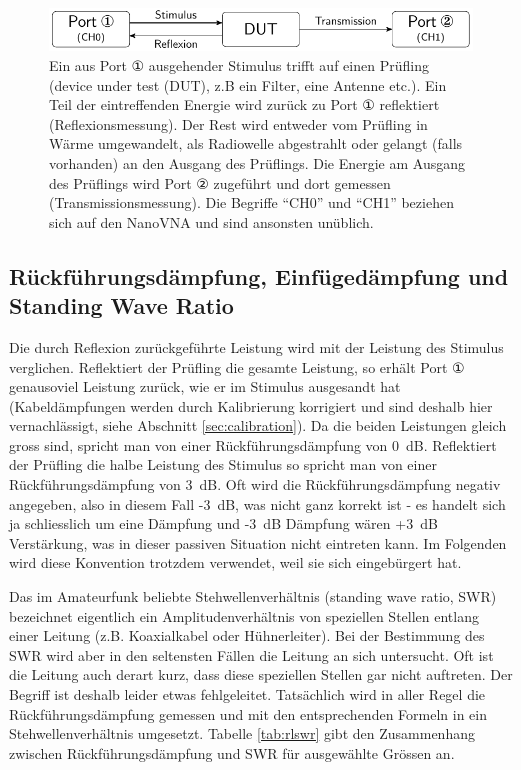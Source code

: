 \documentclass[twoside,a4paper,11pt,halfparskip,DIV=11,notitlepage]{scrartcl}
\begin{document}
\begin{figure}[H]
    \begin{center}
        \includegraphics{figures/vna_dut_setup/vna_dut_setup.pdf}
    \end{center}
    \caption{Ein aus Port ① ausgehender Stimulus trifft auf einen Prüfling (device under test (DUT), z.B
        ein Filter, eine Antenne etc.). Ein Teil der eintreffenden Energie wird zurück zu Port ① reflektiert
        (Reflexionsmessung). Der Rest wird entweder vom Prüfling in Wärme umgewandelt, als Radiowelle
        abgestrahlt oder gelangt (falls vorhanden) an den Ausgang des Prüflings. Die Energie am Ausgang
        des Prüflings wird Port ② zugeführt und dort gemessen (Transmissionsmessung). Die Begriffe ``CH0''
        und ``CH1'' beziehen sich auf den NanoVNA und sind ansonsten unüblich.}
    \label{fig:testset}
\end{figure}

\subsection{Rückführungsdämpfung, Einfügedämpfung und Standing Wave Ratio}

Die durch Reflexion zurückgeführte Leistung wird mit der Leistung des Stimulus verglichen. Reflektiert
der Prüfling die gesamte Leistung, so erhält Port ① genausoviel Leistung zurück, wie er im Stimulus
ausgesandt hat (Kabeldämpfungen werden durch Kalibrierung korrigiert und sind deshalb hier vernachlässigt,
siehe Abschnitt \ref{sec:calibration}). Da die beiden Leistungen gleich gross sind, spricht man von
einer Rückführungsdämpfung von 0~dB. Reflektiert der Prüfling die halbe Leistung des Stimulus so spricht
man von einer Rückführungsdämpfung von 3~dB. Oft wird die Rückführungsdämpfung negativ angegeben, also
in diesem Fall -3~dB, was nicht ganz korrekt ist - es handelt sich ja schliesslich um eine Dämpfung 
und -3~dB Dämpfung wären +3~dB Verstärkung, was in dieser passiven Situation nicht eintreten kann.
Im Folgenden wird diese Konvention trotzdem verwendet, weil sie sich eingebürgert hat.

Das im Amateurfunk beliebte Stehwellenverhältnis (standing wave ratio, SWR) bezeichnet eigentlich
ein Amplitudenverhältnis von speziellen Stellen entlang einer Leitung (z.B. Koaxialkabel oder
Hühnerleiter). Bei der Bestimmung des SWR wird aber in den seltensten Fällen die Leitung an sich
untersucht. Oft ist die Leitung auch derart kurz, dass diese speziellen Stellen gar nicht auftreten.
Der Begriff ist deshalb leider etwas fehlgeleitet. Tatsächlich wird in aller Regel die Rückführungsdämpfung
gemessen und mit den entsprechenden Formeln in ein Stehwellenverhältnis umgesetzt. Tabelle \ref{tab:rlswr}
gibt den Zusammenhang zwischen Rückführungsdämpfung und SWR für ausgewählte Grössen an.
\end{document}
